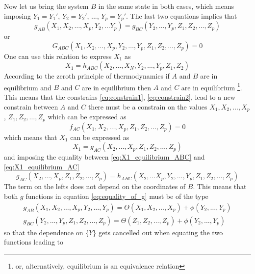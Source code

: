 Now let us bring the system $B$ in the same state in both cases, which means imposing $Y_1 = Y_1'$, $Y_2 = Y_2'$, ..., $Y_p = Y_p'$. The last two equations implies that 
\begin{equation}
    g_{AB} (X_1, X_2, \dots, X_p, Y_2, \dots Y_p) = g_{BC} (Y_2, \dots, Y_p, Z_1, Z_2, \dots, Z_p)
    \label{eq:equality_of_g}
\end{equation}
or
\begin{equation*}
    G_{ABC} (X_1, X_2, \dots, X_p, Y_2, \dots, Y_p, Z_1, Z_2, \dots, Z_p) = 0
\end{equation*}
One can use this relation to express $X_1$ as 
\begin{equation}
    X_1 = h_{ABC}(X_2, \dots, X_N, Y_2, \dots, Y_p, Z_1, Z_2)
    \label{eq:X1_equilibrium_ABC}
\end{equation}
According to the zeroth principle of thermodynamics if $A$ and $B$ are in equilibrium and $B$ and $C$ are in equilibrium then $A$ and $C$ are in equilibrium 
\footnote{or, alternatively, equilibrium is an equivalence relation}. This means that the constrains \ref{eq:constrain1}, \ref{eq:constrain2}, lead to a new constrain between $A$ and $C$
there must be a constrain on the values ${X_1, X_2, \dots, X_p}$, ${Z_1, Z_2, \dots, Z_p}$ which can be expressed as 
\begin{equation*}
    f_{AC} (X_1, X_2, \dots, X_p, Z_1, Z_2, \dots, Z_p) = 0
\end{equation*}
which means that $X_1$ can be expressed as
\begin{equation}
    X_1 = g_{AC} (X_2, \dots, X_p, Z_1, Z_2, \dots, Z_p)
    \label{eq:X1_equilibrium_AC}
\end{equation}
and imposing the equality between \ref{eq:X1_equilibrium_ABC} and \ref{eq:X1_equilibrium_AC}
\begin{equation*}
    g_{AC} (X_2, \dots, X_p, Z_1, Z_2, \dots, Z_p) = h_{ABC}(X_2, \dots X_p, Y_2, \dots, Y_p, Z_1, Z_2, ..., Z_p)
\end{equation*}
The term on the lefts does not depend on the coordinates of $B$. This means that both $g$ functions in equation \ref{eq:equality_of_g} must be of the type
\begin{gather*}
    g_{AB}(X_1, X_2, \dots, X_p, Y_2, \dots, Y_p) = \Theta(X_1, X_2, \dots, X_p) + \phi(Y_2, \dots, Y_p) \\
    g_{BC}(Y_2, \dots, Y_p, Z_1, Z_2, \dots, Z_p) = \Theta(Z_1, Z_2, \dots, Z_p) + \phi(Y_2, \dots, Y_p)
\end{gather*}
so that the dependence on $\{Y\}$ gets cancelled out when equating the two functions leading to 
